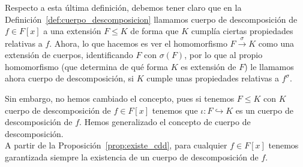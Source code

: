 \noindent
Respecto a esta última definición, debemos tener claro que en la Definición~\ref{def:cuerpo_descomposicion} llamamos cuerpo de descomposición de $f\in F[x]$ a una extensión $F\leq K$ de forma que $K$ cumplía ciertas propiedades relativas a $f$. Ahora, lo que hacemos es ver el homomorfismo $F\stackrel{\sigma}{\to} K$ como una extensión de cuerpos, identificando $F$ con $\sigma(F)$, por lo que al propio homomorfismo (que determina de qué forma $K$ es extensión de $F$) le llamamos ahora cuerpo de descomposición, si $K$ cumple unas propiedades relativas a $f^\sigma$.

\noindent
Sin embargo, no hemos cambiado el concepto, pues si tenemos $F\leq K$ con $K$ cuerpo de descomposición de $f\in F[x]$ tenemos que $\iota:F\hookrightarrow K$ es un cuerpo de descomposición de $f$. Hemos generalizado el concepto de cuerpo de descomposición.\\

\noindent
A partir de la Proposición~\ref{prop:existe_cdd}, para cualquier $f\in F[x]$ tenemos garantizada siempre la existencia de un cuerpo de descomposición de $f$.

